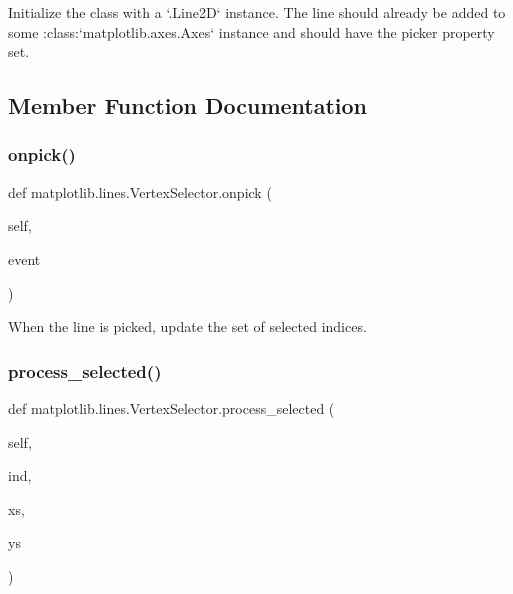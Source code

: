 \begin{DoxyVerb}Initialize the class with a `.Line2D` instance.  The line should
already be added to some :class:`matplotlib.axes.Axes` instance and
should have the picker property set.
\end{DoxyVerb}
 

\subsection{Member Function Documentation}
\mbox{\label{classmatplotlib_1_1lines_1_1VertexSelector_a92fc854e8adaf143b3867f5e20ad3eed}} 
\subsubsection{\texorpdfstring{onpick()}{onpick()}}
{\footnotesize\ttfamily def matplotlib.\+lines.\+Vertex\+Selector.\+onpick (\begin{DoxyParamCaption}\item[{}]{self,  }\item[{}]{event }\end{DoxyParamCaption})}

\begin{DoxyVerb}When the line is picked, update the set of selected indices.\end{DoxyVerb}
 \mbox{\label{classmatplotlib_1_1lines_1_1VertexSelector_a5efff34258b2ec438ec05d5bce7585c1}} 
\subsubsection{\texorpdfstring{process\+\_\+selected()}{process\_selected()}}
{\footnotesize\ttfamily def matplotlib.\+lines.\+Vertex\+Selector.\+process\+\_\+selected (\begin{DoxyParamCaption}\item[{}]{self,  }\item[{}]{ind,  }\item[{}]{xs,  }\item[{}]{ys }\end{DoxyParamCaption})}

